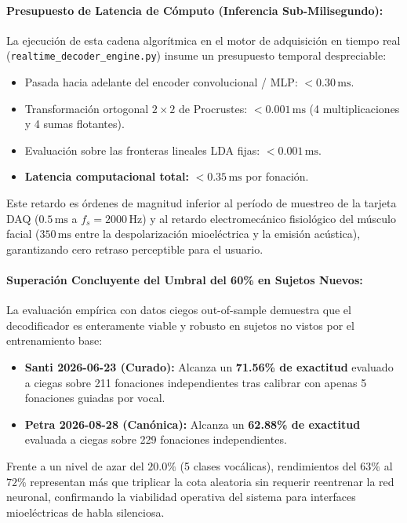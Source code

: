 \documentclass[11pt,a4paper]{article}
\begin{document}
\paragraph{Presupuesto de Latencia de Cómputo (Inferencia Sub-Milisegundo):}
La ejecución de esta cadena algorítmica en el motor de adquisición en tiempo real (\texttt{realtime\_decoder\_engine.py}) insume un presupuesto temporal despreciable:
\begin{itemize}
    \item Pasada hacia adelante del encoder convolucional / MLP: $< 0.30\,\text{ms}$.
    \item Transformación ortogonal $2 \times 2$ de Procrustes: $< 0.001\,\text{ms}$ (4 multiplicaciones y 4 sumas flotantes).
    \item Evaluación sobre las fronteras lineales LDA fijas: $< 0.001\,\text{ms}$.
    \item \textbf{Latencia computacional total:} $< 0.35\,\text{ms}$ por fonación.
\end{itemize}
Este retardo es órdenes de magnitud inferior al período de muestreo de la tarjeta DAQ ($0.5\,\text{ms}$ a $f_s = 2000\,\text{Hz}$) y al retardo electromecánico fisiológico del músculo facial ($350\,\text{ms}$ entre la despolarización mioeléctrica y la emisión acústica), garantizando cero retraso perceptible para el usuario.

\paragraph{Superación Concluyente del Umbral del 60\% en Sujetos Nuevos:}
La evaluación empírica con datos ciegos out-of-sample demuestra que el decodificador es enteramente viable y robusto en sujetos no vistos por el entrenamiento base:
\begin{itemize}
    \item \textbf{Santi 2026-06-23 (Curado):} Alcanza un \textbf{71.56\% de exactitud} evaluado a ciegas sobre 211 fonaciones independientes tras calibrar con apenas 5 fonaciones guiadas por vocal.
    \item \textbf{Petra 2026-08-28 (Canónica):} Alcanza un \textbf{62.88\% de exactitud} evaluada a ciegas sobre 229 fonaciones independientes.
\end{itemize}
Frente a un nivel de azar del $20.0\%$ (5 clases vocálicas), rendimientos del $63\%$ al $72\%$ representan más que triplicar la cota aleatoria sin requerir reentrenar la red neuronal, confirmando la viabilidad operativa del sistema para interfaces mioeléctricas de habla silenciosa.
\end{document}
